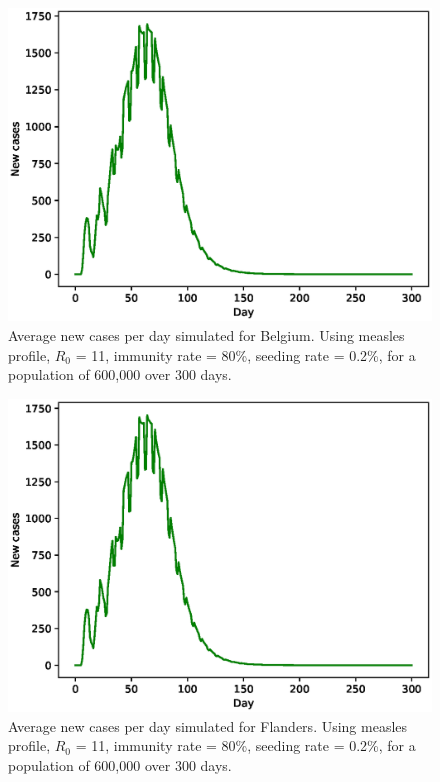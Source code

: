 \documentclass{article}
\begin{document}
\begin{figure}
	\centering
	\includegraphics[width=\linewidth]{./Belgie/AVG_SR=02.eps}
	\caption{Average new cases per day simulated for Belgium. Using measles profile, $R_0$ = 11, immunity rate = 80\%, seeding rate = 0.2\%, for a population of 600,000 over 300 days.}
	\label{AVG_Belgium}
\end{figure}

\begin{figure}
	\centering
	\includegraphics[width=\linewidth]{./Vlaanderen/AVG_SR=02.eps}
	\caption{Average new cases per day simulated for Flanders. Using measles profile, $R_0$ = 11, immunity rate = 80\%, seeding rate = 0.2\%, for a population of 600,000 over 300 days.}
	\label{AVG_Flanders}
\end{figure}
\end{document}

